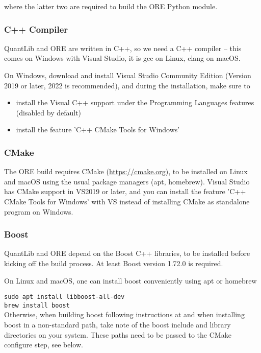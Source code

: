 where the latter two are required to build the ORE Python module.

\subsubsection*{C++ Compiler}

QuantLib and ORE are written in C++, so we need a C++ compiler -- this comes on Windows with Visual Studio, it is gcc on Linux,
clang on macOS.

On Windows, download and install Visual Studio Community Edition (Version 2019 or later, 2022 is recommended), and during the installation,
make sure to
\begin{itemize}
\item install the Visual C++ support under the Programming Languages features (disabled by default)
\item install the feature 'C++ CMake Tools for Windows'
\end{itemize}

\subsubsection*{CMake}

The ORE build requires CMake (\url{https://cmake.org}), to be installed on Linux and macOS using the usual package managers (apt, homebrew).
Visual Studio has CMake support in VS2019 or later, and you can install the feature 'C++ CMake Tools for Windows' with VS instead of
installing CMake as standalone program on Windows.

\subsubsection*{Boost}

QuantLib and ORE depend on the Boost C++ libraries, to be installed before kicking off the build process.
At least Boost version 1.72.0 is required.

On Linux and macOS, one can install boost conveniently using apt or homebrew

\medskip
    {\tt sudo apt install libboost-all-dev} \\
    {\tt brew install boost} \\

\medskip
Otherwise, when building boost following instructions at \cite{boost} and when installing boost in a non-standard path, take note of the
boost include and library directories on your system. These paths need to be passed to the CMake configure step, see below.


